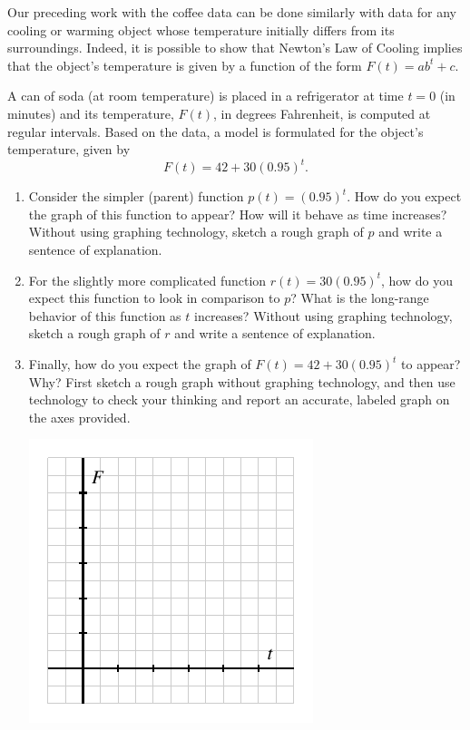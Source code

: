 \documentclass[nooutcomes]{ximera}
\begin{document}
Our preceding work with the coffee data can be done similarly with data for any cooling or warming object whose temperature initially differs from its surroundings.  Indeed, it is possible to show that Newton's Law of Cooling implies that the object's temperature is given by a function of the form $F(t) = ab^t + c$.

\begin{exploration}
A can of soda (at room temperature) is placed in a refrigerator at time $t = 0$ (in minutes) and its temperature, $F(t)$, in degrees Fahrenheit, is computed at regular intervals. Based on the data, a model is formulated for the object's temperature, given by
\begin{equation*}
F(t) = 42 + 30(0.95)^{t}\text{.}
\end{equation*}
\begin{enumerate}[label=\alph*.]
\item Consider the simpler (parent) function $p(t) = (0.95)^t$. How do you expect the graph of this function to appear? How will it behave as time increases? Without using graphing technology, sketch a rough graph of $p$ and write a sentence of explanation.
\item For the slightly more complicated function $r(t) = 30 (0.95)^{t}$, how do you expect this function to look in comparison to $p$?  What is the long-range behavior of this function as $t$ increases? Without using graphing technology, sketch a rough graph of $r$ and write a sentence of explanation.
\item Finally, how do you expect the graph of $F(t) = 42 + 30(0.95)^{t}$ to appear? Why?  First sketch a rough graph without graphing technology, and then use technology to check your thinking and report an accurate, labeled graph on the axes provided.
\begin{image}
\includegraphics{modeling-F-t-blank-axes}

\end{image}
\end{enumerate}
\end{exploration}
\end{document}
